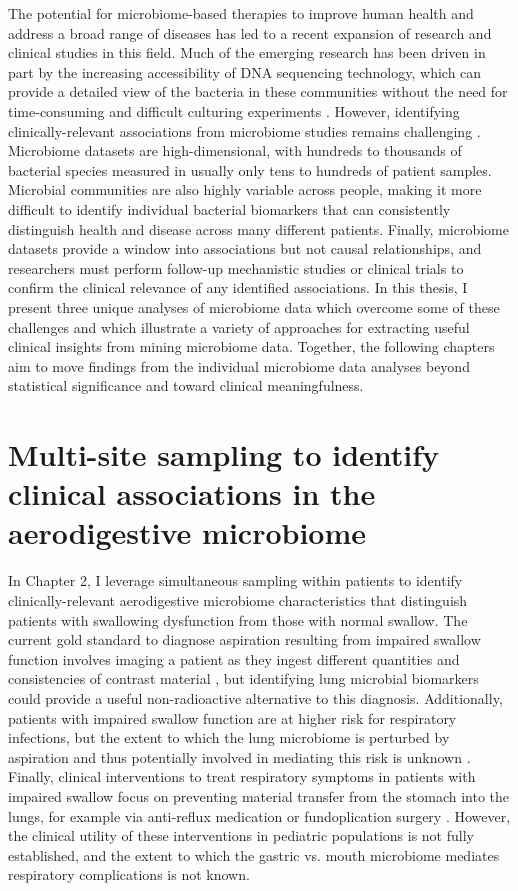 The potential for microbiome-based therapies to improve human health and address a broad range of diseases has led to a recent expansion of research and clinical studies in this field.
Much of the emerging research has been driven in part by the increasing accessibility of DNA sequencing technology, which can provide a detailed view of the bacteria in these communities without the need for time-consuming and difficult culturing experiments \cite{hmp-2012}.
However, identifying clinically-relevant associations from microbiome studies remains challenging \cite{knights-2011-predictivevalue}.
Microbiome datasets are high-dimensional, with hundreds to thousands of bacterial species measured in usually only tens to hundreds of patient samples.
Microbial communities are also highly variable across people, making it more difficult to identify individual bacterial biomarkers that can consistently distinguish health and disease across many different patients.
Finally, microbiome datasets provide a window into associations but not causal relationships, and researchers must perform follow-up mechanistic studies or clinical trials to confirm the clinical relevance of any identified associations.
In this thesis, I present three unique analyses of microbiome data which overcome some of these challenges and which illustrate a variety of approaches for extracting useful clinical insights from mining microbiome data.
Together, the following chapters aim to move findings from the individual microbiome data analyses beyond statistical significance and toward clinical meaningfulness.

\section{Multi-site sampling to identify clinical associations in the aerodigestive microbiome}

In Chapter 2, I leverage simultaneous sampling within patients to identify clinically-relevant aerodigestive microbiome characteristics that distinguish patients with swallowing dysfunction from those with normal swallow.
The current gold standard to diagnose aspiration resulting from impaired swallow function involves imaging a patient as they ingest different quantities and consistencies of contrast material \cite{cook-1999-dysphagia}, but identifying lung microbial biomarkers could provide a useful non-radioactive alternative to this diagnosis.
Additionally, patients with impaired swallow function are at higher risk for respiratory infections, but the extent to which the lung microbiome is perturbed by aspiration and thus potentially involved in mediating this risk is unknown \cite{cook-1999-dysphagia,thomson-2016-asppneumo}.
Finally, clinical interventions to treat respiratory symptoms in patients with impaired swallow focus on preventing material transfer from the stomach into the lungs, for example via anti-reflux medication or fundoplication surgery \cite{goldin-2006-fundo,lee-2008-fundo}.
However, the clinical utility of these interventions in pediatric populations is not fully established, and the extent to which the gastric vs. mouth microbiome mediates respiratory complications is not known.

